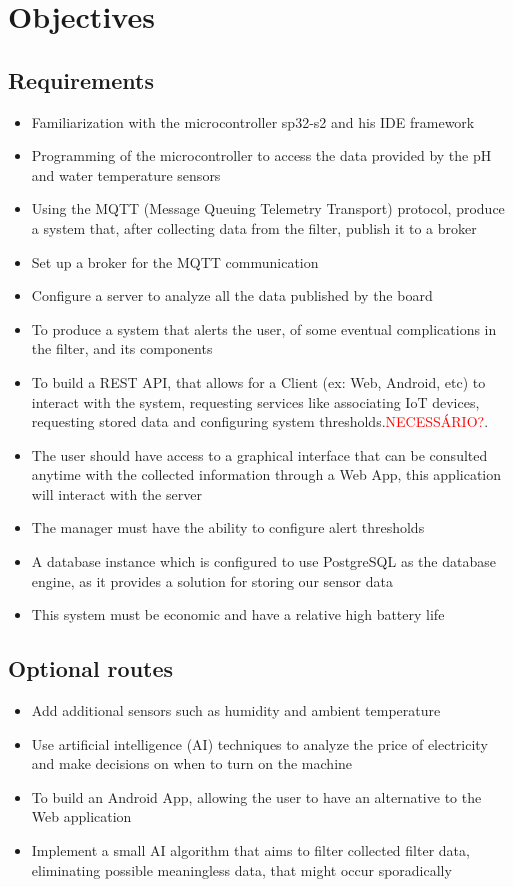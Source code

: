 \documentclass[a4paper,twoside,11pt]{article}
\begin{document}
\section{Objectives}
 \subsection{Requirements}
 \begin{itemize}
    \item Familiarization with the microcontroller sp32-s2 and his IDE framework
    \item Programming of the microcontroller to access the data provided by the pH and water temperature sensors
    \item Using the MQTT (Message Queuing Telemetry Transport) protocol, produce a system that, after collecting data from the filter, publish it to a broker
    \item Set up a broker for the MQTT communication
    \item Configure a server to analyze all the data published by the board
    \item To produce a system that alerts the user, of some eventual complications in the filter, and its components
    \item To build a REST API, that allows for a Client (ex: Web, Android, etc) to interact with the system, requesting services like associating IoT devices, requesting stored data and configuring system thresholds.\textcolor{red}{NECESSÁRIO?}.
    \item The user should have access to a graphical interface that can be consulted anytime with the collected information through a Web App, this application will interact with the server
    \item The manager must have the ability to configure alert thresholds
    \item A database instance which is configured to use PostgreSQL as the database engine, as it provides a solution for storing our sensor data
    \item This system must be economic and have a relative high battery life
\end{itemize}
 \subsection{Optional routes}
 \begin{itemize}
    \item Add additional sensors such as humidity and ambient temperature
    \item Use artificial intelligence (AI) techniques to analyze the price of electricity and make decisions on when to turn on the machine 
    \item To build an Android App, allowing the user to have an alternative to the Web application
    \item Implement a small AI algorithm that aims to filter collected filter data, eliminating possible meaningless data, that might occur sporadically
 \end{itemize}
\end{document}
